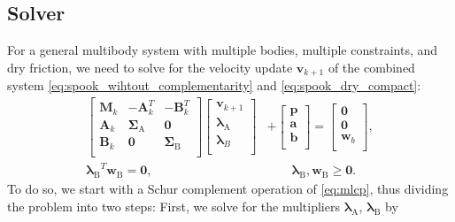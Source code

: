 \documentclass[preprint,12pt]{elsarticle}
\let\vec\bm
\let\mat\mathbf
\numberwithin{equation}{section}
\def\jaca{\mat{A}}
\def\jacb{\mat{B}}
\def\tA{\text{A}}
\def\tB{\text{B}}
\def\lambdaa{\vec{\lambda}_{\text{A}}}
\def\lambdab{\vec{\lambda}_{\text{B}}}
\def\drydiagonal{\mat{\Sigma}_\text{B}}
\newcommand{\complementarityalign}[2]{{#1}^T{#2}=\vec{0}, &\qquad #1, #2 \geq \vec{0}}
\begin{document}
\subsection{Solver}
For a general multibody system with multiple bodies, multiple constraints, and dry friction, we need to solve for the velocity update $\vec{v}_{k+1}$ of the combined system \eqref{eq:spook_wihtout_complementarity} and \eqref{eq:spook_dry_compact}:
\begin{equation}
    \label{eq:mlcp}
    \begin{aligned}
        \begin{bmatrix}
            \mat{M}_k & -\jaca_k^T     & -\jacb_k^T   \\
            \jaca_k & \mat{\Sigma}_\tA & \mat{0}      \\
            \jacb_k & \mat{0}        & \drydiagonal \\
        \end{bmatrix}
        \begin{bmatrix}
            \vec{v}_{k+1}   \\
            \vec{\lambda}_\tA \\
            \vec{\lambda}_B \\
        \end{bmatrix}
         & +
        \begin{bmatrix}
            \vec{p} \\
            \vec{a} \\
            \vec{b} \\
        \end{bmatrix}
        =
        \begin{bmatrix}
            \vec{0}   \\
            \vec{0}   \\
            \vec{w}_b \\
        \end{bmatrix}, \\
        \complementarityalign{\lambdab}{\vec{w}_{\tB}}.
    \end{aligned}
\end{equation}
To do so, we start with a Schur complement operation of \eqref{eq:mlcp}, thus dividing the problem into two steps:
First, we solve for the multipliers $\lambdaa$, $\lambdab$ by
\end{document}
